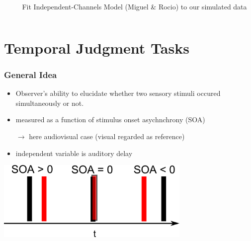 \documentclass[xcolor={fixpdftex,hyperref,x11names},10pt,pdftex,hyperref={pdftex}]{beamer}
\begin{document}
\begin{frame}
\begin{columns}
\begin{column}{0.30\textwidth}
  \end{column}
  \begin{column}{0.70\textwidth}
  Fit Independent-Channels Model (Miguel \& Rocio) to our simulated data 
  \end{column}
  \end{columns}
\end{frame} 




\section{Temporal Judgment Tasks}
\label{sec:tjt}

\begin{frame}
	\frametitle{General Idea}

	\begin{itemize}
		\item Observer's ability to elucidate whether two sensory stimuli occured simultaneously or not.
		\item measured as a function of stimulus onset asychnchrony (SOA)
		\item[$\rightarrow$] here audiovisual case (visual regarded as reference)
		\item independent variable is auditory delay

	\end{itemize}
	
\begin{center}
	\includegraphics[width=0.7\textwidth]{figs/SOA-in-task.png}
\end{center}
	
\end{frame}
\end{document}
